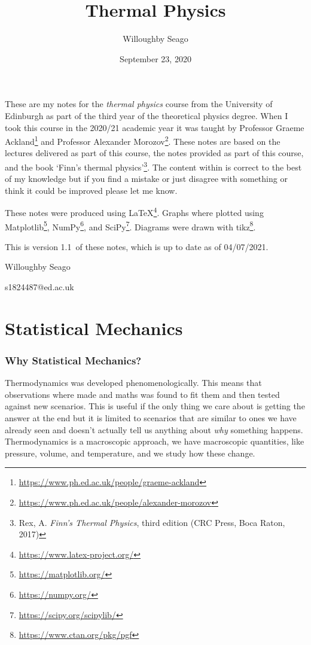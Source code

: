 \documentclass[a4paper]{article}
\author{Willoughby Seago}
\date{September 23, 2020}
\title{Thermal Physics}
\newcommand{\notesVersion}{1.1}
\newcommand{\notesDate}{04/07/2021}
\begin{document}
    \maketitle
    These are my notes for the \textit{thermal physics} course from the University of Edinburgh as part of the third year of the theoretical physics degree.
    When I took this course in the 2020/21 academic year it was taught by Professor Graeme Ackland\footnote{\url{https://www.ph.ed.ac.uk/people/graeme-ackland}} and Professor Alexander Morozov\footnote{\url{https://www.ph.ed.ac.uk/people/alexander-morozov}}.
    These notes are based on the lectures delivered as part of this course, the notes provided as part of this course, and the book `Finn's thermal physics'\footnote{Rex, A. \textit{Finn's Thermal Physics}, third edition (CRC Press, Boca Raton, 2017)}.
    The content within is correct to the best of my knowledge but if you find a mistake or just disagree with something or think it could be improved please let me know.
    
    These notes were produced using \LaTeX\footnote{\url{https://www.latex-project.org/}}.
    Graphs where plotted using Matplotlib\footnote{\url{https://matplotlib.org/}}, NumPy\footnote{\url{https://numpy.org/}}, and SciPy\footnote{\url{https://scipy.org/scipylib/}}.
    Diagrams were drawn with tikz\footnote{\url{https://www.ctan.org/pkg/pgf}}.
    
    This is version \notesVersion~of these notes, which is up to date as of \notesDate.
    \begin{flushright}
        Willoughby Seago
        
        s1824487@ed.ac.uk
    \end{flushright}
    \clearpage
    \tableofcontents
    \listoffigures
    \listoftables
    \printglossary[type=\acronymtype, title=Acronyms, style=long]
    \clearpage
    \begingroup
    \let\clearpage\relax  %
    
    \endgroup
    
    
    \part{Statistical Mechanics}
    \section{Why Statistical Mechanics?}
    Thermodynamics was developed phenomenologically.
    This means that observations where made and maths was found to fit them and then tested against new scenarios.
    This is useful if the only thing we care about is getting the answer at the end but it is limited to scenarios that are similar to ones we have already seen and doesn't actually tell us anything about \emph{why} something happens.
    Thermodynamics is a macroscopic approach, we have macroscopic quantities, like pressure, volume, and temperature, and we study how these change.
    
\end{document}
